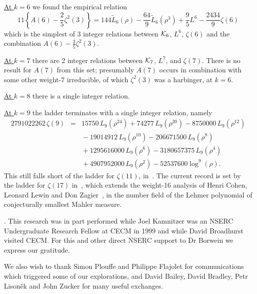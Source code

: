 \documentclass[a4paper,a4paper]{article}
\newcommand{\df}[2]{\mbox{$\frac{#1}{#2}$}}
\begin{document}
\underline{At $k=6$} we found the empirical relation
$$11\left\{A(6)-\df25\zeta^2(3)\right\}=
144\widetilde{L}_6(\rho)-\df{64}{9}\widetilde{L}_6(\rho^3)
+\df95L^6-\df{2434}{9}\zeta(6)$$
which is the simplest of 3 integer relations between
${\cal K}_6$, $L^6$, $\zeta(6)$ and the combination
$A(6)-\frac25\zeta^2(3)$.

\vspace{\baselineskip}

\underline{At $k=7$} there are 2 integer relations between
${\cal K}_7$, $L^7$, and $\zeta(7)$. There is no result for $A(7)$
from this set; presumably $A(7)$ occurs in combination with
some other weight-7 irreducible, of which $\zeta^2(3)$ was
a harbinger, at $k=6$.

\vspace{\baselineskip}

\underline{At $k=8$} there is a single integer relation.

\vspace{\baselineskip}

\underline{At $k=9$} the ladder terminates with
a single integer relation, namely
\begin{eqnarray*}
2791022262\,\zeta(9)&=&
 15750\,L_9(\rho^{24})
+74277\,L_9(\rho^{20})
-8750000\,L_9(\rho^{12})\\&&{}
-19014912\,L_9(\rho^{10})
-206671500\,L_9(\rho^{8})\\&&{}
+1295616000\,L_9(\rho^{6})
-3180657375\,L_9(\rho^{4})\\&&{}
+4907952000\,L_9(\rho^{2})
-52537600\log^9(\rho).
\end{eqnarray*}
This still falls short of the ladder for $\zeta(11)$, in~\cite{lad11}.
The current record is set by the ladder for $\zeta(17)$ in~\cite{DHJB2},
which extends the weight-16 analysis of Henri Cohen, Leonard Lewin and Don
Zagier~\cite{CLZ}, in the number field of the Lehmer polynomial of
conjecturally smallest Mahler measure.


\vspace{\baselineskip}
\vfill
{}.  This research was in part
performed while Joel Kamnitzer was an NSERC Undergraduate Research Fellow
at CECM in 1999 and while David Broadhurst visited CECM. For this and
other direct NSERC support to Dr Borwein we express our gratitude.

We also wish to thank Simon Plouffe and Philippe Flajolet for communications
which triggered some of our explorations, and David Bailey, David
Bradley, Petr Lison\v ek and John Zucker for many useful exchanges.
\end{document}
